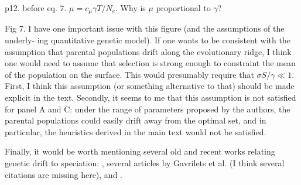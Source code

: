 
\begin{point}{p12. before eq. 7.}
    $\mu = c_\mu \gamma T /N_e$. Why is $\mu$ proportional to $\gamma$?
\end{point}


\begin{point}{Fig 7.}
    I have one important issue with this figure (and the assumptions of the underly-
ing quantitative genetic model). If one wants to be consistent with the assumption that
parental populations drift along the evolutionary ridge, I think one would need to assume
that selection is strong enough to constraint the mean of the population on the surface. This
would presumably require that $\sigma S /\gamma \ll 1$. First, I think this assumption (or something
alternative to that) should be made explicit in the text. Secondly, it seems to me that this
assumption is not satisfied for panel A and C: under the range of parameters proposed by
the authors, the parental populations could easily drift away from the optimal set, and in
particular, the heuristics derived in the main text would not be satisfied.
\end{point}


\begin{point}{}
    Finally, it would be worth mentioning several old and recent works relating genetic drift
    to speciation: \citet{yamaguchi2013first}, several articles by Gavrilets et al. (I think several
    citations are missing here), and \citet{pina2019does}.
\end{point}




